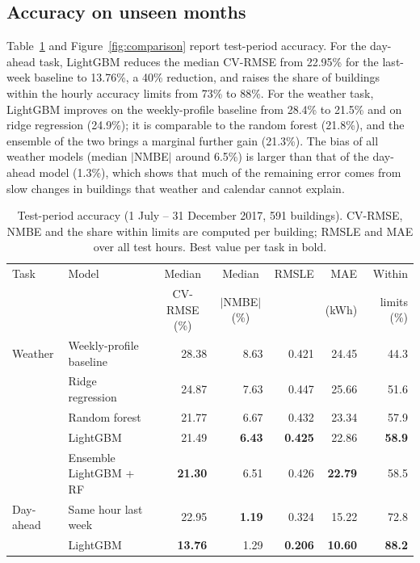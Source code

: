 \documentclass[11pt,a4paper]{article}
\begin{document}
\subsection{Accuracy on unseen months}
Table~\ref{tab:main} and Figure~\ref{fig:comparison} report test-period accuracy. For the day-ahead task, LightGBM
reduces the median CV-RMSE from 22.95\% for the last-week baseline to 13.76\%, a 40\% reduction, and raises the share of
buildings within the hourly accuracy limits from 73\% to 88\%. For the weather task, LightGBM improves on the
weekly-profile baseline from 28.4\% to 21.5\% and on ridge regression (24.9\%); it is comparable to the random
forest (21.8\%), and the ensemble of the two brings a marginal further gain (21.3\%). The bias of all weather models
(median $|$NMBE$|$ around 6.5\%) is larger than that of the day-ahead model (1.3\%), which shows that much of the
remaining error comes from slow changes in buildings that weather and calendar cannot explain.

\begin{table}[ht]
\centering
\caption{Test-period accuracy (1 July -- 31 December 2017, 591 buildings). CV-RMSE, NMBE and the share within
limits are computed per building; RMSLE and MAE over all test hours. Best value per task in bold.}
\label{tab:main}
\footnotesize\setlength{\tabcolsep}{4.5pt}
\begin{tabular}{llrrrrr}
\toprule
Task & Model & \multicolumn{1}{c}{Median} & \multicolumn{1}{c}{Median} & RMSLE & MAE & Within \\
     &       & \multicolumn{1}{c}{CV-RMSE (\%)} & \multicolumn{1}{c}{$|$NMBE$|$ (\%)} & & (kWh) & limits (\%) \\
\midrule
Weather   & Weekly-profile baseline     & 28.38 & 8.63 & 0.421 & 24.45 & 44.3 \\
          & Ridge regression            & 24.87 & 7.63 & 0.447 & 25.66 & 51.6 \\
          & Random forest               & 21.77 & 6.67 & 0.432 & 23.34 & 57.9 \\
          & LightGBM                    & 21.49 & \textbf{6.43} & \textbf{0.425} & 22.86 & \textbf{58.9} \\
          & Ensemble LightGBM + RF      & \textbf{21.30} & 6.51 & 0.426 & \textbf{22.79} & 58.5 \\
\midrule
Day-ahead & Same hour last week         & 22.95 & \textbf{1.19} & 0.324 & 15.22 & 72.8 \\
          & LightGBM                    & \textbf{13.76} & 1.29 & \textbf{0.206} & \textbf{10.60} & \textbf{88.2} \\
\bottomrule
\end{tabular}
\end{table}
\end{document}
